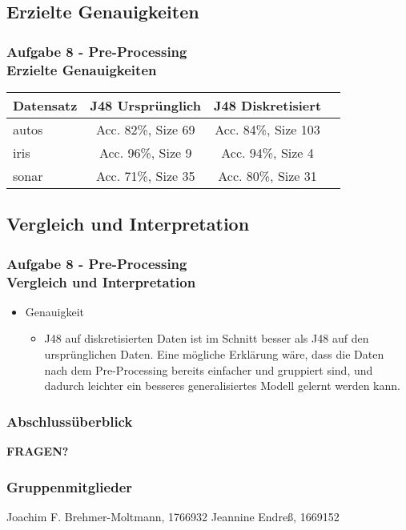 \documentclass[accentcolor=tud10b,colorbacktitle,inverttitle,landscape,german,presentation,t]{tudbeamer}
\begin{document}
    \subsection{Erzielte Genauigkeiten}
    
    \begin{frame}[t]
    \frametitle{Aufgabe 8 - Pre-Processing\\ Erzielte Genauigkeiten}
        \begin{tabular}[htbp]{l||c|c|c}
            Datensatz & J48 Ursprünglich & J48 Diskretisiert \\
            \hline
            \hline
            autos & Acc. 82\%, Size 69 & Acc. 84\%, Size 103 \\
            \hline
            iris & Acc. 96\%, Size 9 & Acc. 94\%, Size 4 \\
            \hline
            sonar & Acc. 71\%, Size 35 & Acc. 80\%, Size 31 \\
        \end{tabular}
    \end{frame}
    
    \subsection{Vergleich und Interpretation}
    
    \begin{frame}[t]
    \frametitle{Aufgabe 8 - Pre-Processing\\ Vergleich und Interpretation}
        \begin{itemize}
            \item Genauigkeit
            \begin{itemize}
                \item J48 auf diskretisierten Daten ist im Schnitt besser als J48 auf den ursprünglichen Daten. Eine mögliche Erklärung wäre, dass die Daten nach dem Pre-Processing bereits einfacher und gruppiert sind, und dadurch leichter ein besseres generalisiertes Modell gelernt werden kann.
            \end{itemize}
        \end{itemize}
    \end{frame}

\begin{frame}
\frametitle{Abschlussüberblick}
\tableofcontents
\begin{center}
\textbf{\Large FRAGEN?}
\end{center}
\end{frame}

\begin{frame}
\frametitle{Gruppenmitglieder}
Joachim F. Brehmer-Moltmann, 1766932 \vfill
Jeannine Endreß, 1669152
\end{frame}
\end{document}
